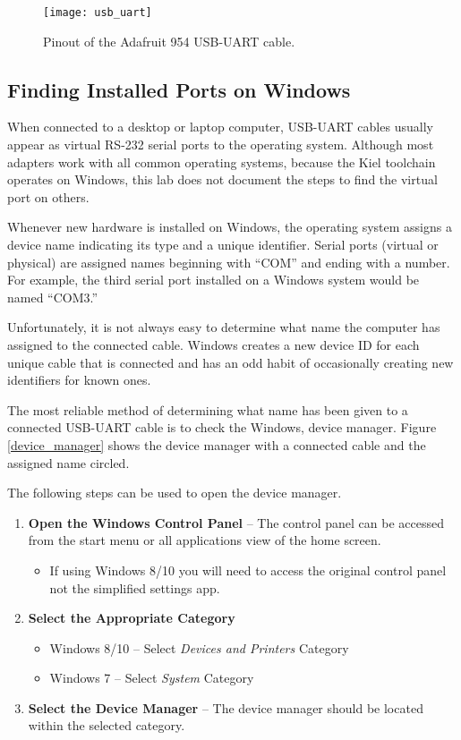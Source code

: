 \documentclass[11pt,fleqn]{book} %
\begin{document}
\begin{figure}[]
    \centering\texttt{[image: usb\_uart]}
    \caption{Pinout of the Adafruit 954 USB-UART cable.}
    \label{usb_uart}
\end{figure}

\subsection{Finding Installed Ports on Windows}
When connected to a desktop or laptop computer, USB-UART cables usually appear as virtual RS-232 serial ports to the operating system. Although most adapters work with all common operating systems, because the Kiel toolchain operates on Windows, this lab does not document the steps to find the virtual port on others. 

Whenever new hardware is installed on Windows, the operating system assigns a device name indicating its type and a unique identifier. Serial ports (virtual or physical) are assigned names beginning with ``COM'' and ending with a number. For example, the third serial port installed on a Windows system would be named ``COM3.''

Unfortunately, it is not always easy to determine what name the computer has assigned to the connected cable. Windows creates a new device ID for each unique cable that is connected and has an odd habit of occasionally creating new identifiers for known ones. 

The most reliable method of determining what name has been given to a connected USB-UART cable is to check the Windows, device manager. Figure \ref{device_manager} shows the device manager with a connected cable and the assigned name circled. 

The following steps can be used to open the device manager.

\begin{enumerate}
    \item \textbf{Open the Windows Control Panel} -- The control panel can be accessed from the start menu or all applications view of the home screen.
        \begin{itemize}
            \item If using Windows 8/10 you will need to access the original control panel not the simplified settings app.
        \end{itemize} 
    \item \textbf{Select the Appropriate Category}
     \begin{itemize}
        \item Windows 8/10 -- Select \textit{Devices and Printers} Category
        \item Windows 7 -- Select \textit{System} Category
    \end{itemize} 
    \item \textbf{Select the Device Manager} -- The device manager should be located within the selected category.
\end{enumerate}
\end{document}

